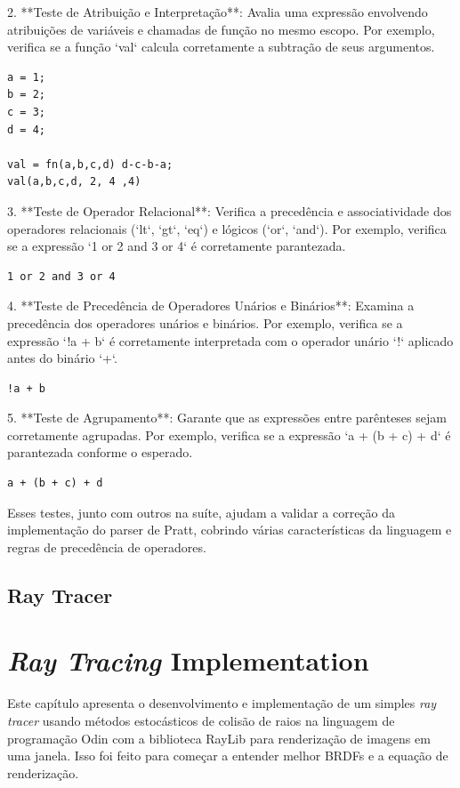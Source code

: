 \documentclass[english, 
               brazil, 
               bsc] %
               {dcomp-abntex2}
\begin{document}
2. **Teste de Atribuição e Interpretação**: Avalia uma expressão envolvendo atribuições de variáveis e chamadas de função no mesmo escopo. Por exemplo, verifica se a função `val` calcula corretamente a subtração de seus argumentos.

\begin{verbatim}
a = 1;
b = 2;
c = 3;
d = 4;

val = fn(a,b,c,d) d-c-b-a; 
val(a,b,c,d, 2, 4 ,4)
\end{verbatim}

3. **Teste de Operador Relacional**: Verifica a precedência e associatividade dos operadores relacionais (`lt`, `gt`, `eq`) e lógicos (`or`, `and`). Por exemplo, verifica se a expressão `1 or 2 and 3 or 4` é corretamente parantezada.

\begin{verbatim}
1 or 2 and 3 or 4
\end{verbatim}

4. **Teste de Precedência de Operadores Unários e Binários**: Examina a precedência dos operadores unários e binários. Por exemplo, verifica se a expressão `!a + b` é corretamente interpretada com o operador unário `!` aplicado antes do binário `+`.

\begin{verbatim}
!a + b
\end{verbatim}

5. **Teste de Agrupamento**: Garante que as expressões entre parênteses sejam corretamente agrupadas. Por exemplo, verifica se a expressão `a + (b + c) + d` é parantezada conforme o esperado.

\begin{verbatim}
a + (b + c) + d
\end{verbatim}

Esses testes, junto com outros na suíte, ajudam a validar a correção da implementação do parser de Pratt, cobrindo várias características da linguagem e regras de precedência de operadores.


\section{Ray Tracer}
\chapter{\textit{Ray Tracing} Implementation}

Este capítulo apresenta o desenvolvimento e implementação de um simples \textit{ray tracer} usando métodos estocásticos de colisão de raios na linguagem de programação Odin com a biblioteca RayLib para renderização de imagens em uma janela. Isso foi feito para começar a entender melhor BRDFs e a equação de renderização.
\end{document}
